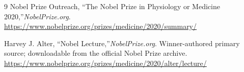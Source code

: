 \begin{thebibliography}{9}
Nobel Prize Outreach, ``The Nobel Prize in Physiology or Medicine 2020,''\emph{NobelPrize.org}.\\
\url{https://www.nobelprize.org/prizes/medicine/2020/summary/}

Harvey J. Alter, ``Nobel Lecture,''\emph{NobelPrize.org}. Winner-authored primary source; downloadable from the official Nobel Prize archive.\\
\url{https://www.nobelprize.org/prizes/medicine/2020/alter/lecture/}
\end{thebibliography}
